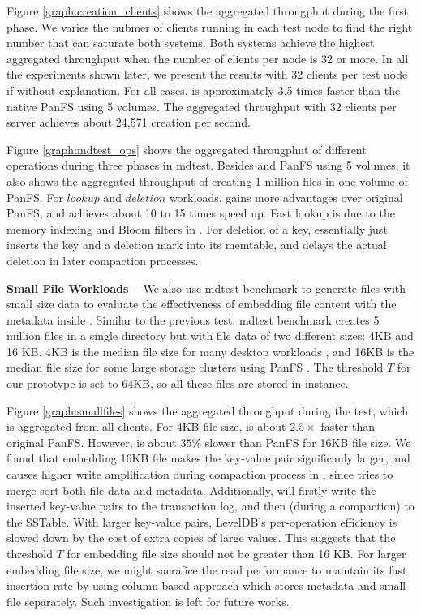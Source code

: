 Figure \ref{graph:creation_clients} shows the aggregated througphut during
the first phase. We varies the nubmer of clients running in each test node
to find the right number that can saturate both systems.
Both systems achieve the highest aggregated throughput when the number
of clients per node is 32 or more. In all the experiments shown later,
we present the results with 32 clients per test node if without explanation.
For all cases, \psys is approximately 3.5 times faster than the native PanFS
using 5 volumes. The aggregated throughput with 32 clients per server
achieves about 24,571 creation per second.

Figure \ref{graph:mdtest_ops} shows the aggregated througphut of
different operations during three phases in mdtest.
Besides \psys and PanFS using 5 volumes, it also shows
the aggregated throughput of creating 1 million files in one volume of PanFS.
For $lookup$ and $deletion$ workloads,
\psys gains more advantages over original PanFS,
and achieves about 10 to 15 times speed up.
Fast lookup is due to the memory indexing and Bloom filters in \ldb.
For deletion of a key, \ldb essentially just inserts the key and a deletion mark
into its memtable, and delays the actual deletion in later compaction processes.


\textbf{Small File Workloads -- }
We also use mdtest benchmark to generate files with small size data to evaluate
the effectiveness of embedding file content with the metadata inside \tfs.
Similar to the previous test,
mdtest benchmark creates 5 million files in a single directory
but with file data of two different sizes: 4KB and 16 KB.
4KB is the median file size for many desktop workloads \cite{Bill11},
and 16KB is the median file size for some large storage clusters using PanFS \cite{brent13}.
The threshold $T$ for our prototype is set to 64KB, so all these files
are stored in \tfs instance.

Figure \ref{graph:smallfiles} shows the aggregated throughput during the test,
which is aggregated from all clients. For 4KB file size,
\psys is about $2.5\times$ faster than original PanFS.
However, \psys is about $35\%$ slower than PanFS for 16KB file size.
We found that embedding 16KB file makes the key-value pair significanly larger,
and causes higher write amplification during compaction process in \ldb,
since \ldb tries to merge sort both file data and metadata.
Additionally, \ldb will firstly write the inserted key-value pairs
to the transaction log, and then (during a compaction) to the SSTable.
With larger key-value pairs, LevelDB's per-operation efficiency is
slowed down by the cost of extra copies of large values.
This suggests that the threshold $T$ for embedding file size should not be
greater than 16 KB. For larger embedding file size,
we might sacrafice the read performance to maintain its fast insertion rate
by using column-based approach which stores metadata and small file separately.
Such investigation is left for future works.


